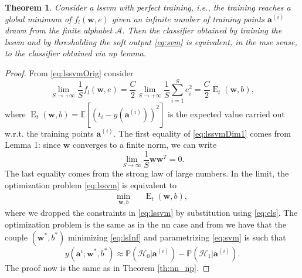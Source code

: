 \documentclass[draftcls,onecolumn,12pt]{IEEEtran}
\newcommand{\ie}{i.e., }
\newcommand{\wrt}{w.r.t. }
\newcommand{\Exp}[1]{\mathbb{E}\left[#1\right]}
\DeclareMathOperator{\E}{E}
\newtheorem{theorem}{Theorem}
\begin{document}
\begin{theorem}
	\label{th:lsnp}
	Consider a \ac{lssvm} with perfect training, \ie the training reaches a global minimum of $f_l(\mathbf{w},e)$ given an infinite number of training points $\bm{a}^{(i)}$ drawn from the finite alphabet $\mathcal A$. Then the classifier obtained by training the \ac{lssvm} and by thresholding the soft output \eqref{eq:svm} is equivalent, in the \ac{mse} sense, to the classifier obtained via \ac{np} lemma.
\end{theorem}
\begin{proof}
	From \eqref{eq:lssvmOrig} consider
	\begin{equation}
	\label{eq:lssvmDim1}
	\lim_{S \to +\infty} \frac{1}{S} f_l(\mathbf{w},e) =\frac{C}{2} \lim_{S \to +\infty}\frac{1}{S}  \sum_{i=1}^S e^2_i	=\frac{C}{2}\E_t(\mathbf{w},b),
	\end{equation}
	where $\E_t(\mathbf{w},b) = \Exp{\left(t_i - y(\mathbf{a}^{(i)})\right)^2} $ is the expected value carried out \wrt the training points $\mathbf{a}^{(i)}$. 
	The first equality of \eqref{eq:lssvmDim1} comes from Lemma 1: since $\mathbf{w}$ converges to a finite norm, we can write
	\begin{equation}
	\lim_{S\to \infty} \frac{1}{S} \mathbf{w} \mathbf{w}^T 	= 0.
	\end{equation} 
	The last equality comes from the strong law of large numbers. In the limit, the optimization problem \eqref{eq:lssvm} is equivalent to
	\begin{equation}
	\label{eq:lsInf}
	\begin{aligned}
	& \underset{\mathbf{w},b}{\text{min}} & &  \E_t(\mathbf{w},b), & 
	\end{aligned}	
	\end{equation}
	where we dropped the constraints in \eqref{eq:lssvm} by substitution using \eqref{eq:els}. The optimization problem is the same as in the \ac{nn} case and from \cite{Ruck-90} we have that the couple $(\mathbf{w}^*,b^*)$ minimizing \eqref{eq:lsInf} and parametrizing \eqref{eq:svm} is such that
	\begin{equation}
	y(\mathbf{a}^i;\mathbf{w}^*,b^*)  \approx \mathbb{P}(\mathcal{H}_0|\mathbf{a}^{(i)}) - \mathbb{P}(\mathcal{H}_1|\mathbf{a}^{(i)}).
	\end{equation}
	The proof now is the same as in Theorem \ref{th:nn_np}.
\end{proof}
\end{document}
